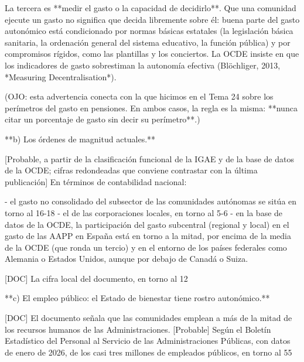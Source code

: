 \documentclass[10pt,a4paper]{article}
\begin{document}
La tercera es **medir el gasto o la capacidad de decidirlo**. Que una comunidad ejecute un gasto no significa que decida libremente sobre él: buena parte del gasto autonómico está condicionado por normas básicas estatales (la legislación básica sanitaria, la ordenación general del sistema educativo, la función pública) y por compromisos rígidos, como las plantillas y los conciertos. La OCDE insiste en que los indicadores de gasto sobrestiman la autonomía efectiva (Blöchliger, 2013, *Measuring Decentralisation*).

(OJO: esta advertencia conecta con la que hicimos en el Tema 24 sobre los perímetros del gasto en pensiones. En ambos casos, la regla es la misma: **nunca citar un porcentaje de gasto sin decir su perímetro**.)

**b) Los órdenes de magnitud actuales.**

[Probable, a partir de la clasificación funcional de la IGAE y de la base de datos de la OCDE; cifras redondeadas que conviene contrastar con la última publicación] En términos de contabilidad nacional:

- el gasto no consolidado del subsector de las comunidades autónomas se sitúa en torno al 16-18%
- el de las corporaciones locales, en torno al 5-6%
- en la base de datos de la OCDE, la participación del gasto subcentral (regional y local) en el gasto de las AAPP en España está en torno a la mitad, por encima de la media de la OCDE (que ronda un tercio) y en el entorno de los países federales como Alemania o Estados Unidos, aunque por debajo de Canadá o Suiza.

[DOC] La cifra local del documento, en torno al 12%

**c) El empleo público: el Estado de bienestar tiene rostro autonómico.**

[DOC] El documento señala que las comunidades emplean a más de la mitad de los recursos humanos de las Administraciones. [Probable] Según el Boletín Estadístico del Personal al Servicio de las Administraciones Públicas, con datos de enero de 2026, de los casi tres millones de empleados públicos, en torno al 55%
\end{document}
